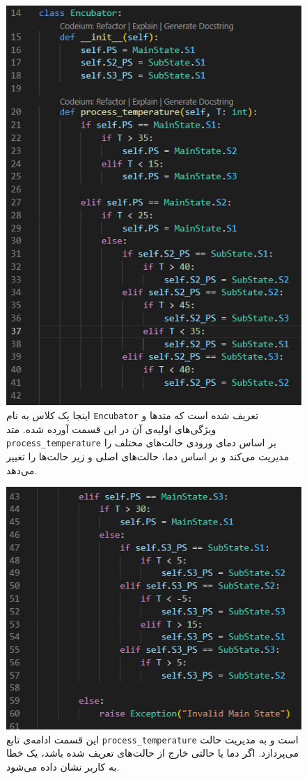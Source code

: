 \begin{figure}[h]
	\centering
	\includegraphics{2.jpg}
	\caption{اینجا یک کلاس به نام \texttt{Encubator} تعریف شده است که متدها و ویژگی‌های اولیه‌ی آن در این قسمت آورده شده. متد \texttt{process\_temperature} بر اساس دمای ورودی حالت‌های مختلف را مدیریت می‌کند و بر اساس دما، حالت‌های اصلی و زیر حالت‌ها را تغییر می‌دهد.}
	\label{fig:label2}
\end{figure}

\begin{figure}[h]
	\centering
	\includegraphics{3.jpg}
	\caption{این قسمت ادامه‌ی تابع \texttt{process\_temperature} است و به مدیریت حالت 
	می‌پردازد. اگر دما یا حالتی خارج از حالت‌های تعریف شده باشد، یک خطا به کاربر نشان داده می‌شود.}
	\label{fig:label3}
\end{figure}

